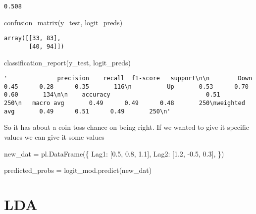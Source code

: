 \documentclass[
  letterpaper,
  DIV=11,
  numbers=noendperiod]{scrreprt}
\newenvironment{Shaded}{\begin{snugshade}}{\end{snugshade}}
\newcommand{\FloatTok}[1]{\textcolor[rgb]{0.68,0.00,0.00}{#1}}
\newcommand{\NormalTok}[1]{\textcolor[rgb]{0.00,0.23,0.31}{#1}}
\newcommand{\OperatorTok}[1]{\textcolor[rgb]{0.37,0.37,0.37}{#1}}
\newcommand{\StringTok}[1]{\textcolor[rgb]{0.13,0.47,0.30}{#1}}
\begin{document}
\begin{verbatim}
0.508
\end{verbatim}

\begin{Shaded}
\begin{Highlighting}[]
\NormalTok{confusion\_matrix(y\_test, logit\_preds)}
\end{Highlighting}
\end{Shaded}

\begin{verbatim}
array([[33, 83],
       [40, 94]])
\end{verbatim}

\begin{Shaded}
\begin{Highlighting}[]
\NormalTok{classification\_report(y\_test, logit\_preds)}
\end{Highlighting}
\end{Shaded}

\begin{verbatim}
'              precision    recall  f1-score   support\n\n        Down       0.45      0.28      0.35       116\n          Up       0.53      0.70      0.60       134\n\n    accuracy                           0.51       250\n   macro avg       0.49      0.49      0.48       250\nweighted avg       0.49      0.51      0.49       250\n'
\end{verbatim}

So it has about a coin toss chance on being right. If we wanted to give
it specific values we can give it some values

\begin{Shaded}
\begin{Highlighting}[]

\NormalTok{new\_dat }\OperatorTok{=}\NormalTok{ pl.DataFrame(\{}
    \StringTok{\textquotesingle{}Lag1\textquotesingle{}}\NormalTok{: [}\FloatTok{0.5}\NormalTok{, }\FloatTok{0.8}\NormalTok{, }\FloatTok{1.1}\NormalTok{],}
    \StringTok{\textquotesingle{}Lag2\textquotesingle{}}\NormalTok{: [}\FloatTok{1.2}\NormalTok{, }\OperatorTok{{-}}\FloatTok{0.5}\NormalTok{, }\FloatTok{0.3}\NormalTok{],}
\NormalTok{\})}

\NormalTok{predicted\_probs }\OperatorTok{=}\NormalTok{ logit\_mod.predict(new\_dat)}
\end{Highlighting}
\end{Shaded}

\section{LDA}\label{lda}
\end{document}
